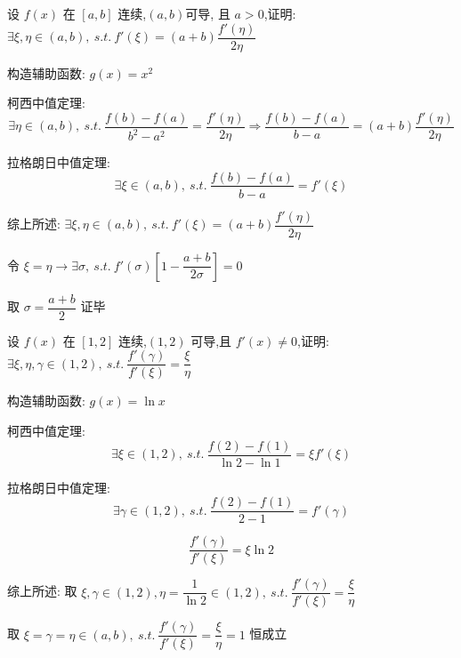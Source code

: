 \begin{proposition}
	设 $f(x)$ 在 $[a,b]$ 连续,$(a,b)$可导, 且 $a>0$,证明: $\exists \xi,\eta\in(a,b),\ s.t.\ f'(\xi)=(a+b)\dfrac{f'(\eta)}{2\eta}$
\end{proposition}
\begin{solution}

	构造辅助函数: $g(x)=x^2$

	柯西中值定理:
	$$\exists\eta\in(a,b),\ s.t.\ \dfrac{f(b)-f(a)}{b^2-a^2}=\dfrac{f'(\eta)}{2\eta}\Rightarrow \dfrac{f(b)-f(a)}{b-a}=(a+b)\dfrac{f'(\eta)}{2\eta}$$

	拉格朗日中值定理:
	$$\exists\xi\in(a,b),\ s.t.\ \dfrac{f(b)-f(a)}{b-a}=f'(\xi)$$

	综上所述: $\exists \xi,\eta\in(a,b),\ s.t.\ f'(\xi)=(a+b)\dfrac{f'(\eta)}{2\eta}$
\end{solution}
\begin{anymark}[注]
	令 $\xi=\eta\to \exists \sigma,\ s.t.\ f'(\sigma)[1-\dfrac{a+b}{2\sigma}]=0$

	取 $\sigma=\dfrac{a+b}{2}$ 证毕
\end{anymark}

\begin{proposition}
	设 $f(x)$ 在 $[1,2]$ 连续,$(1,2)$ 可导,且 $f'(x)\neq 0$,证明: $\exists \xi,\eta,\gamma\in(1,2),\ s.t.\ \dfrac{f'(\gamma)}{f'(\xi)}=\dfrac{\xi}{\eta}$
\end{proposition}
\begin{solution}

	构造辅助函数: $g(x)=\ln x$

	柯西中值定理:
	$$\exists\xi\in(1,2),\ s.t.\ \dfrac{f(2)-f(1)}{\ln 2-\ln 1}=\xi f'(\xi)$$

	拉格朗日中值定理:
	$$\exists\gamma\in(1,2),\ s.t.\ \dfrac{f(2)-f(1)}{2-1}=f'(\gamma)$$

	$$\dfrac{f'(\gamma)}{f'(\xi)}=\xi \ln 2$$

	综上所述: 取 $\xi,\gamma\in(1,2),\eta=\dfrac{1}{\ln2}\in(1,2),\ s.t.\ \dfrac{f'(\gamma)}{f'(\xi)}=\dfrac{\xi}{\eta}$
\end{solution}
\begin{anymark}[注]
	取 $\xi=\gamma=\eta\in(a,b),\ s.t.\ \dfrac{f'(\gamma)}{f'(\xi)}=\dfrac{\xi}{\eta} = 1$ 恒成立
\end{anymark}


